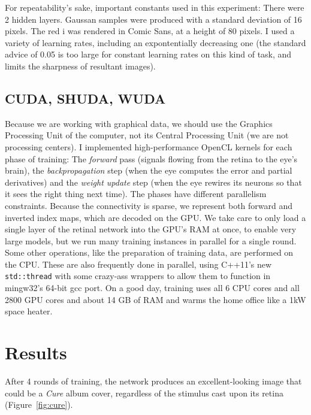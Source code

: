 \documentclass[twocolumn]{article}
\begin{document}
For repeatability's sake, important constants used in this experiment:
There were 2 hidden layers. Gaussan samples were produced with a
standard deviation of 16 pixels. The red i was rendered in Comic Sans,
at a height of 80 pixels. I used a variety of learning rates,
including an expontentially decreasing one (the standard advice of
0.05 is too large for constant learning rates on this kind of task, and
limits the sharpness of resultant images).

\subsection{CUDA, SHUDA, WUDA}

Because we are working with graphical data, we should use the Graphics
Processing Unit of the computer, not its Central Processing Unit (we
are not processing centers). I implemented high-performance OpenCL
kernels for each phase of training: The {\em forward} pass (signals
flowing from the retina to the eye's brain), the {\em backpropagation}
step (when the eye computes the error and partial derivatives) and the
{\em weight update} step (when the eye rewires its neurons so that it
sees the right thing next time). The phases have different parallelism
constraints. Because the connectivity is sparse, we represent both
forward and inverted index maps, which are decoded on the GPU. We take
care to only load a single layer of the retinal network into the GPU's
RAM at once, to enable very large models, but we run many training
instances in parallel for a single round. Some other operations, like
the preparation of training data, are performed on the CPU. These are
also frequently done in parallel, using C++11's new {\tt std::thread}
with some crazy-ass wrappers to allow them to function in mingw32's
64-bit gcc port. On a good day, training uses all 6 CPU cores and all
2800 GPU cores and about 14 GB of RAM and warms the home office like a
1kW space heater.

\section{Results}

After 4 rounds of training, the network produces an excellent-looking
image that could be a {\em Cure} album cover, regardless of the stimulus
cast upon its retina (Figure~\ref{fig:cure}).
\end{document}
